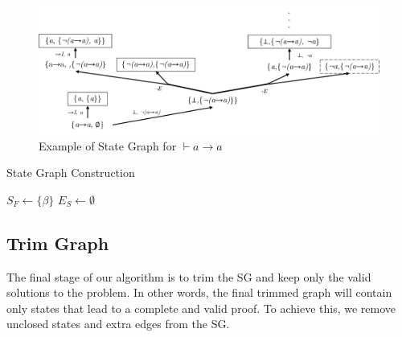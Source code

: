 \documentclass[runningheads]{llncs}
\begin{document}
\vspace{-1em}
\begin{figure}[H]
    \centering
    \includegraphics[width=1\linewidth]{resources/sg-gen.png}
    \caption{Example of State Graph for \(\vdash a \to a\)}
    \label{fig:st-ex}
\end{figure}
\vspace{-2em}

\begin{algorithm}[H]
\caption{State Graph Construction}

$S_F \leftarrow \{\beta\}$ 
$E_S \leftarrow \emptyset$ 

\end{algorithm}

\subsection{Trim Graph}

The final stage of our algorithm is to trim the SG and keep only the valid solutions to the problem. In other words, the final trimmed graph will contain only states that lead to a complete and valid proof. To achieve this, we remove unclosed states and extra edges from the SG.
\end{document}
